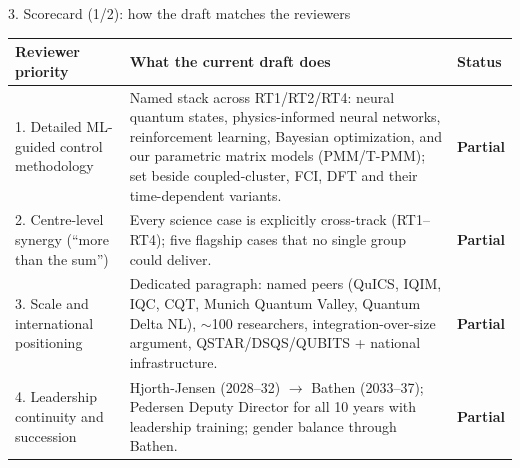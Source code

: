 \documentclass[10pt,aspectratio=169]{beamer}
\newcommand{\partialA}{\textcolor{orange!85!black}{\textbf{Partial}}}
\begin{document}
\begin{frame}{3. Scorecard (1/2): how the draft matches the reviewers}
  \footnotesize
  \renewcommand{\arraystretch}{1.3}
  \begin{tabular}{@{}p{3.0cm}p{7.6cm}p{1.4cm}@{}}
    \toprule
    \textbf{Reviewer priority} & \textbf{What the current draft does} & \textbf{Status}\\
    \midrule
    1. Detailed ML-guided control methodology &
    Named stack across RT1/RT2/RT4: neural quantum states, physics-informed neural networks,
    reinforcement learning, Bayesian optimization, and our parametric matrix models (PMM/T-PMM);
    set beside coupled-cluster, FCI, DFT and their time-dependent variants. & \partialA \\
    2. Centre-level synergy (``more than the sum'') &
    Every science case is explicitly cross-track (RT1--RT4); five flagship cases that no single
    group could deliver. & \partialA \\
    3. Scale and international positioning &
    Dedicated paragraph: named peers (QuICS, IQIM, IQC, CQT, Munich Quantum Valley, Quantum Delta
    NL), $\sim$100 researchers, integration-over-size argument, QSTAR/DSQS/QUBITS + national
    infrastructure. & \partialA \\
    4. Leadership continuity and succession &
    Hjorth-Jensen (2028--32) $\rightarrow$ Bathen (2033--37); Pedersen Deputy Director for all 10
    years with leadership training; gender balance through Bathen. & \partialA \\
    \bottomrule
  \end{tabular}
\end{frame}
\end{document}
